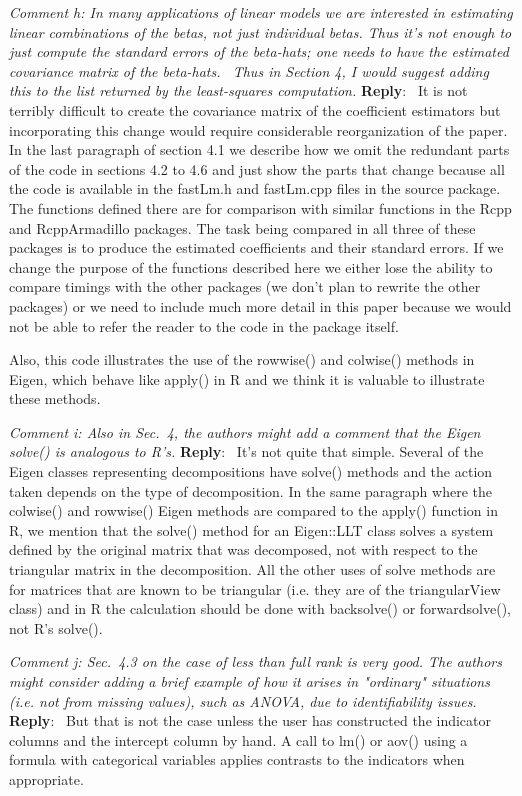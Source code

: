 \documentclass[10pt]{article}
\newcommand{\pointRaised}[2]{\smallskip %
  \textsl{{\fontseries{b}\selectfont #1}: #2}\newline}
\newcommand{\reply}[1]{\textbf{Reply}:\ #1 \smallskip } %
\begin{document}
\pointRaised{Comment h}{ In many applications of linear models we are
  interested in estimating linear combinations of the betas, not just
  individual betas.  Thus it's not enough to just compute the standard
  errors of the beta-hats; one needs to have the estimated covariance
  matrix of the beta-hats.  Thus in Section 4, I would suggest adding
  this to the list returned by the least-squares computation.
}
\reply{ 
  It is not terribly difficult to create the covariance matrix of the
  coefficient estimators but incorporating this change would require
  considerable reorganization of the paper.  In the last paragraph of
  section 4.1 we describe how we omit the redundant parts of the code
  in sections 4.2 to 4.6 and just show the parts that change because
  all the code is available in the fastLm.h and fastLm.cpp files in
  the source package.  The functions defined there are for comparison
  with similar functions in the Rcpp and RcppArmadillo packages.  The
  task being compared in all three of these packages is to produce the
  estimated coefficients and their standard errors.  If we change the
  purpose of the functions described here we either lose the ability
  to compare timings with the other packages (we don't plan to rewrite
  the other packages) or we need to include much more detail in this
  paper because we would not be able to refer the reader to the code
  in the package itself.

  Also, this code illustrates the use of the rowwise() and colwise()
  methods in Eigen, which behave like apply() in R and we think it is
  valuable to illustrate these methods.
}


\pointRaised{Comment i}{
  Also in Sec.~4, the authors might add a comment that the Eigen
  solve() is analogous to R's.
}
\reply{
  It's not quite that simple.  Several of the Eigen classes
  representing decompositions have solve() methods and the action taken
  depends on the type of decomposition.  In the same paragraph where
  the colwise() and rowwise() Eigen methods are compared to the
  apply() function in R, we mention that the solve() method for an
  Eigen::LLT class solves a system defined by the original matrix that
  was decomposed, not with respect to the triangular matrix in the
  decomposition.  All the other uses of solve methods are for matrices
  that are known to be triangular (i.e. they are of the triangularView
  class) and in R the calculation should be done with backsolve()
  or forwardsolve(), not R's solve().
}


\pointRaised{Comment j}{
  Sec.~4.3 on the case of less than full rank is very good. The
  authors might consider adding a brief example of how it arises in 
  "ordinary" situations (i.e. not from missing values), such as ANOVA, due
  to identifiability issues.
}
\reply{
  But that is not the case unless the user has constructed the
  indicator columns and the intercept column by hand.  A call to lm()
  or aov() using a formula with categorical variables applies
  contrasts to the indicators when appropriate.
}
\end{document}
